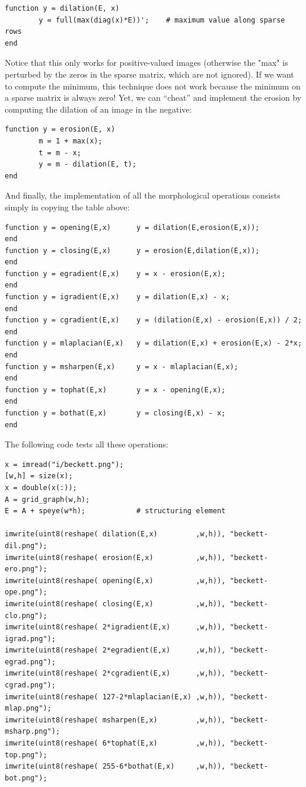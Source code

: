 \begin{verbatim}
function y = dilation(E, x)
        y = full(max(diag(x)*E))';    # maximum value along sparse rows
end
\end{verbatim}

Notice that this only works for positive-valued images (otherwise the "max"
is perturbed by the zeros in the sparse matrix, which are not ignored).  If
we want to compute the minimum, this technique does not work because the
minimum on a sparse matrix is always zero!  Yet, we can ``cheat'' and
implement the erosion by computing the dilation of an image in the negative:

\begin{verbatim}
function y = erosion(E, x)
        m = 1 + max(x);
        t = m - x;
        y = m - dilation(E, t);
end
\end{verbatim}

And finally, the implementation of all the morphological operations consists
simply in copying the table above:

\begin{verbatim}
function y = opening(E,x)      y = dilation(E,erosion(E,x));              end
function y = closing(E,x)      y = erosion(E,dilation(E,x));              end
function y = egradient(E,x)    y = x - erosion(E,x);                      end
function y = igradient(E,x)    y = dilation(E,x) - x;                     end
function y = cgradient(E,x)    y = (dilation(E,x) - erosion(E,x)) / 2;    end
function y = mlaplacian(E,x)   y = dilation(E,x) + erosion(E,x) - 2*x;    end
function y = msharpen(E,x)     y = x - mlaplacian(E,x);                   end
function y = tophat(E,x)       y = x - opening(E,x);                      end
function y = bothat(E,x)       y = closing(E,x) - x;                      end
\end{verbatim}

The following code tests all these operations:

\begin{verbatim}
x = imread("i/beckett.png");
[w,h] = size(x);
x = double(x(:));
A = grid_graph(w,h);
E = A + speye(w*h);            # structuring element

imwrite(uint8(reshape( dilation(E,x)         ,w,h)), "beckett-dil.png");
imwrite(uint8(reshape( erosion(E,x)          ,w,h)), "beckett-ero.png");
imwrite(uint8(reshape( opening(E,x)          ,w,h)), "beckett-ope.png");
imwrite(uint8(reshape( closing(E,x)          ,w,h)), "beckett-clo.png");
imwrite(uint8(reshape( 2*igradient(E,x)      ,w,h)), "beckett-igrad.png");
imwrite(uint8(reshape( 2*egradient(E,x)      ,w,h)), "beckett-egrad.png");
imwrite(uint8(reshape( 2*cgradient(E,x)      ,w,h)), "beckett-cgrad.png");
imwrite(uint8(reshape( 127-2*mlaplacian(E,x) ,w,h)), "beckett-mlap.png");
imwrite(uint8(reshape( msharpen(E,x)         ,w,h)), "beckett-msharp.png");
imwrite(uint8(reshape( 6*tophat(E,x)         ,w,h)), "beckett-top.png");
imwrite(uint8(reshape( 255-6*bothat(E,x)     ,w,h)), "beckett-bot.png");
\end{verbatim}

